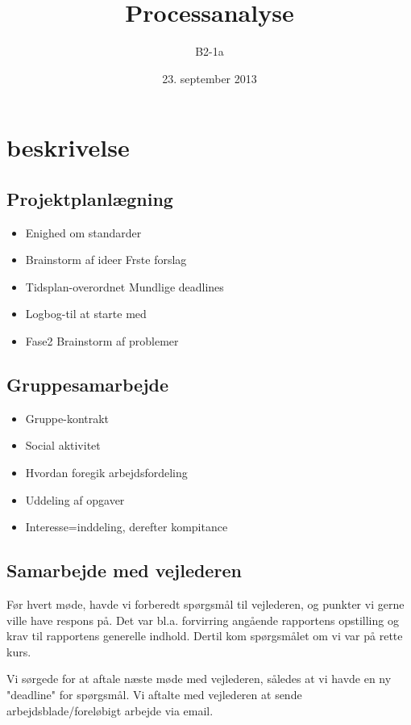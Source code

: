 


\title{Processanalyse}
\author{B2-1a}
\date{23. september 2013}
\maketitle

\section{beskrivelse}

\subsection{Projektplanlægning}
\begin{itemize}
\item Enighed om standarder
\item Brainstorm af ideer
\subitem Frste forslag
\item Tidsplan-overordnet
\subitem Mundlige deadlines
\item Logbog-til at starte med
\item Fase2 Brainstorm af problemer
\end{itemize}

\subsection{Gruppesamarbejde}

\begin{itemize}
\item Gruppe-kontrakt
\item Social aktivitet
\item Hvordan  foregik arbejdsfordeling
\item Uddeling af opgaver
\item Interesse=inddeling, derefter kompitance
\end{itemize}

\subsection{Samarbejde med vejlederen}


Før hvert møde, havde vi forberedt spørgsmål til vejlederen, og punkter vi gerne ville have respons på. Det var bl.a. forvirring angående rapportens opstilling og krav til rapportens generelle indhold. Dertil kom spørgsmålet om vi var på rette kurs.

Vi sørgede for at aftale næste møde med vejlederen, således at vi havde en ny "deadline" for spørgsmål. Vi aftalte med vejlederen at sende arbejdsblade/foreløbigt arbejde via email.



